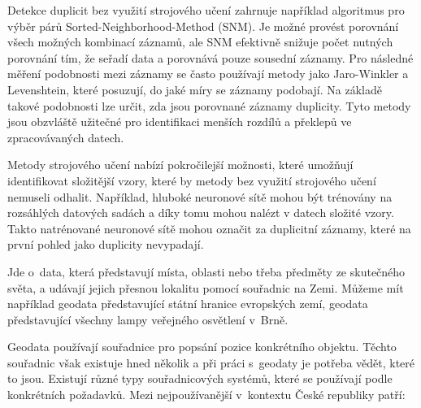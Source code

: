 

Detekce duplicit bez využití strojového učení zahrnuje například algoritmus pro výběr párů Sorted-Neighborhood-Method (SNM). Je možné provést porovnání všech možných kombinací záznamů, ale SNM efektivně snižuje počet nutných porovnání tím, že seřadí data a porovnává pouze sousední záznamy. Pro následné měření podobnosti mezi záznamy se často používají metody jako Jaro-Winkler a Levenshtein, které posuzují, do jaké míry se záznamy podobají. Na základě takové podobnosti lze určit, zda jsou porovnané záznamy duplicity. Tyto metody jsou obzvláště užitečné pro identifikaci menších rozdílů a překlepů ve zpracovávaných datech. \cite{draisbach_choosing_2013}

Metody strojového učení nabízí pokročilejší možnosti, které umožňují identifikovat složitější vzory, které by metody bez využití strojového učení nemuseli odhalit. Například, hluboké neuronové sítě mohou být trénovány na rozsáhlých datových sadách a díky tomu mohou nalézt v datech složité vzory. Takto natrénované neuronové sítě mohou označit za duplicitní záznamy, které na první pohled jako duplicity nevypadají. \cite{pasek_mqdd_2022}

Jde o~data, která představují místa, oblasti nebo třeba předměty ze skutečného světa, a udávají jejich přesnou lokalitu pomocí souřadnic na Zemi. Můžeme mít například geodata představující státní hranice evropských zemí, geodata představující všechny lampy veřejného osvětlení v~Brně.


Geodata používají souřadnice pro popsání pozice konkrétního objektu. Těchto souřadnic však existuje hned několik a při práci s~geodaty je potřeba vědět, které to jsou. Existují různé typy souřadnicových systémů, které se používají podle konkrétních požadavků. Mezi nejpoužívanější v~kontextu České republiky patří:

